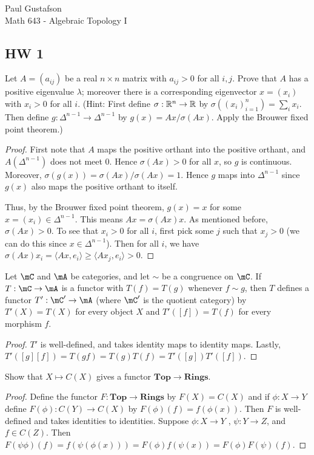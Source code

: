 \documentclass{article}
\begin{document}
\noindent Paul Gustafson\\
\noindent Math 643 - Algebraic Topology I

\subsection*{HW 1}
 Let $A = (a_{ij})$ be a real $n \times n$ matrix with $a_{ij} > 0$ for all $i,j$. Prove that $A$ has a positive
eigenvalue $\lambda$; moreover there is a corresponding eigenvector $x = (x_i)$ with $x_i > 0$ for all $i$.
(Hint: First define $\sigma: \mathbb{R}^n \to \mathbb{R}$ by $\sigma((x_i)_{i=1}^n) = \sum_i x_i$. Then define $g: \Delta^{n-1} \to \Delta^{n-1}$
by $g(x) = Ax / \sigma(Ax)$. Apply the Brouwer fixed point theorem.)

\begin{proof}
  First note that $A$ maps the positive orthant into the positive orthant, and $A(\Delta^{n-1})$ does not meet $0$.  Hence
$\sigma(Ax) > 0$ for all $x$, so $g$ is continuous.
 Moreover, $\sigma(g(x)) = \sigma(Ax) / \sigma(Ax) = 1$.  Hence $g$ maps into $\Delta^{n-1}$ since $g(x)$ also maps the positive
orthant to itself.

Thus, by the Brouwer fixed point theorem, $g(x) = x$ for some $x = (x_i) \in \Delta^{n-1}$. This means $Ax = \sigma(Ax) x$. As
mentioned before, $\sigma(Ax) > 0$.  To see that $x_i > 0$ for all $i$, first pick some $j$ such that $x_j > 0$ (we can do this
since $x \in \Delta^{n-1}$). Then for all $i$, we have $\sigma(Ax) x_i = \langle Ax, e_i \rangle  \ge \langle Ax_j, e_i \rangle > 0$.
\end{proof} 

 Let $\mC$ and $\mA$ be categories, and let $\sim$ be a congruence on $\mC$. If $T: \mC \to \mA$ is a functor
with $T(f) = T(g)$ whenever $f \sim g$, then $T$ defines a functor $T': \mC' \to \mA$ (where $\mC'$ is the quotient
category) by $T'(X) = T(X)$ for every object $X$ and $T'([f]) = T(f)$ for every morphism $f$.
\begin{proof}
$T'$ is well-defined, and takes identity maps to identity maps. Lastly, $T'([g] [f]) = T(g f) = T(g) T(f) = T'([g])T'([f])$.
\end{proof}

 Show that $X \mapsto C(X)$ gives a functor  $ \mathbf{Top} \to \mathbf{Rings}$.
\begin{proof}
Define the functor $F: \mathbf{Top} \to \mathbf{Rings}$ by $F(X) = C(X)$ and if $\phi:X \to Y$
define $F(\phi): C(Y) \to C(X)$ by $F(\phi)(f) = f(\phi(x))$.  Then $F$ is well-defined and takes identities to identities.
Suppose $\phi: X\to Y$ , $\psi: Y \to Z$, and $f \in C(Z)$.  Then $F(\psi \phi)(f) = f(\psi(\phi(x))) = F(\phi) f(\psi(x)) = 
F(\phi) F(\psi) (f)$.
\end{proof}
\end{document}
